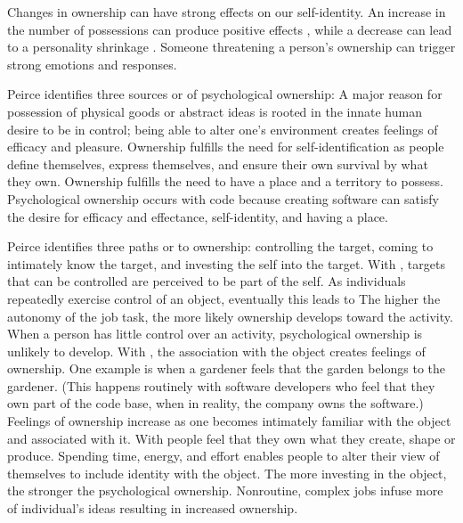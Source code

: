 Changes in ownership can have strong effects on our self-identity. An increase in the number of possessions can produce positive effects \cite{Formanek1994}, while a decrease can lead to a personality shrinkage \cite{James1890}. Someone threatening a person's ownership can trigger strong emotions and responses.

Peirce \cite{Pierce2001} identifies three sources or  of psychological ownership:  A major reason for possession of physical goods or abstract ideas is rooted in the innate human desire to be in control; being able to alter one's environment creates feelings of efficacy and pleasure. Ownership fulfills the need for self-identification as people define themselves, express themselves, and ensure their own survival by what they own. Ownership fulfills the need to have a place and a territory to possess.  Psychological ownership occurs with code because creating software can satisfy the desire for efficacy and effectance, self-identity, and having a place.

Peirce identifies three paths or  to ownership: controlling the target, coming to intimately know the target, and investing the self into the target. With , targets that can be controlled are perceived to be part of the self.  As  individuals repeatedly exercise control of an object, eventually this leads to  The higher the autonomy of the job task, the more likely ownership develops toward the activity. When a person has little control over an activity, psychological ownership is unlikely to develop. With , the association with the object creates feelings of ownership. One example is when a gardener feels that the garden belongs to the gardener. (This happens routinely with software developers who feel that they own part of the code base, when in reality, the company owns the software.) Feelings of ownership increase as one becomes intimately familiar with the object and associated with it. With  people feel that they own what they create, shape or produce. Spending time, energy, and effort enables people to alter their view of themselves to include identity with the object. The more investing in the object, the stronger the psychological ownership. Nonroutine, complex jobs infuse more of individual's ideas resulting in increased ownership.

